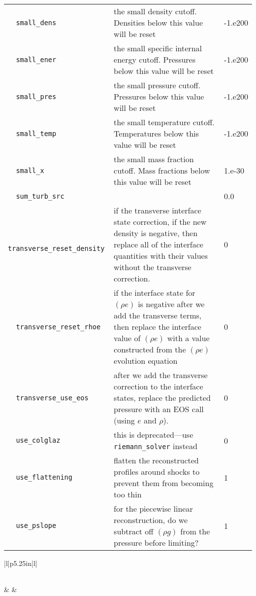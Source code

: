 \begin{landscape}
{\begin{center}
\begin{longtable}{|l|p{5.25in}|l|}
\rowcolor{tableShade}
\verb=  small_dens  = &   the small density cutoff.  Densities below this value will be reset  &  -1.e200 \\
\verb=  small_ener  = &   the small specific internal energy cutoff.  Pressures below this value will be reset  &  -1.e200 \\
\rowcolor{tableShade}
\verb=  small_pres  = &   the small pressure cutoff.  Pressures below this value will be reset  &  -1.e200 \\
\verb=  small_temp  = &   the small temperature cutoff.  Temperatures below this value will be reset  &  -1.e200 \\
\rowcolor{tableShade}
\verb=  small_x  = &   the small mass fraction cutoff. Mass fractions below this value will be reset  &  1.e-30 \\
\verb=  sum_turb_src  = &    &  0.0 \\
\rowcolor{tableShade}
\verb=  transverse_reset_density  = &   if the transverse interface state correction, if the new density is negative, then replace all of the interface quantities with their values without the transverse correction.  &  0 \\
\verb=  transverse_reset_rhoe  = &   if the interface state for $(\rho e)$ is negative after we add the transverse terms, then replace the interface value of $(\rho e)$ with a value constructed from the $(\rho e)$ evolution equation  &  0 \\
\rowcolor{tableShade}
\verb=  transverse_use_eos  = &   after we add the transverse correction to the interface states, replace the predicted pressure with an EOS call (using $e$ and $\rho$).  &  0 \\
\verb=  use_colglaz  = &   this is deprecated---use {\tt riemann\_solver} instead  &  0 \\
\rowcolor{tableShade}
\verb=  use_flattening  = &   flatten the reconstructed profiles around shocks to prevent them from becoming too thin  &  1 \\
\verb=  use_pslope  = &   for the piecewise linear reconstruction, do we subtract off $(\rho g)$ from the pressure before limiting?  &  1 \\


\end{longtable}
\end{center}

} %


{\small

\renewcommand{\arraystretch}{1.5}
%
\begin{center}
\begin{longtable}{|l|p{5.25in}|l|}
\caption[ parallelization
 parameters.]{ parallelization
 parameters.} \label{table:  parallelization
 parameters. runtime} \\
%
\hline {} & 
        & 
        \\ \hline 
\endfirsthead


\end{longtable}
\end{center}}
\end{landscape}

